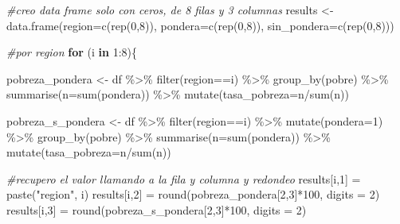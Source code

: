 \documentclass[
]{book}
\newenvironment{Shaded}{\begin{snugshade}}{\end{snugshade}}
\newcommand{\AttributeTok}[1]{\textcolor[rgb]{0.77,0.63,0.00}{#1}}
\newcommand{\CommentTok}[1]{\textcolor[rgb]{0.56,0.35,0.01}{\textit{#1}}}
\newcommand{\ControlFlowTok}[1]{\textcolor[rgb]{0.13,0.29,0.53}{\textbf{#1}}}
\newcommand{\DecValTok}[1]{\textcolor[rgb]{0.00,0.00,0.81}{#1}}
\newcommand{\FunctionTok}[1]{\textcolor[rgb]{0.00,0.00,0.00}{#1}}
\newcommand{\NormalTok}[1]{#1}
\newcommand{\OtherTok}[1]{\textcolor[rgb]{0.56,0.35,0.01}{#1}}
\newcommand{\SpecialCharTok}[1]{\textcolor[rgb]{0.00,0.00,0.00}{#1}}
\newcommand{\StringTok}[1]{\textcolor[rgb]{0.31,0.60,0.02}{#1}}
\begin{document}
\begin{Shaded}
\begin{Highlighting}[]
\CommentTok{\#creo data frame solo con ceros, de 8 filas y 3 columnas}
\NormalTok{results }\OtherTok{\textless{}{-}} \FunctionTok{data.frame}\NormalTok{(}\AttributeTok{region=}\FunctionTok{c}\NormalTok{(}\FunctionTok{rep}\NormalTok{(}\DecValTok{0}\NormalTok{,}\DecValTok{8}\NormalTok{)),}
                      \AttributeTok{pondera=}\FunctionTok{c}\NormalTok{(}\FunctionTok{rep}\NormalTok{(}\DecValTok{0}\NormalTok{,}\DecValTok{8}\NormalTok{)),}
                      \AttributeTok{sin\_pondera=}\FunctionTok{c}\NormalTok{(}\FunctionTok{rep}\NormalTok{(}\DecValTok{0}\NormalTok{,}\DecValTok{8}\NormalTok{)))}

\CommentTok{\#por region}
\ControlFlowTok{for}\NormalTok{ (i }\ControlFlowTok{in} \DecValTok{1}\SpecialCharTok{:}\DecValTok{8}\NormalTok{)\{}
  
\NormalTok{  pobreza\_pondera }\OtherTok{\textless{}{-}}\NormalTok{ df }\SpecialCharTok{\%\textgreater{}\%} \FunctionTok{filter}\NormalTok{(region}\SpecialCharTok{==}\NormalTok{i) }\SpecialCharTok{\%\textgreater{}\%} 
                            \FunctionTok{group\_by}\NormalTok{(pobre) }\SpecialCharTok{\%\textgreater{}\%} \FunctionTok{summarise}\NormalTok{(}\AttributeTok{n=}\FunctionTok{sum}\NormalTok{(pondera)) }\SpecialCharTok{\%\textgreater{}\%} 
                                                \FunctionTok{mutate}\NormalTok{(}\AttributeTok{tasa\_pobreza=}\NormalTok{n}\SpecialCharTok{/}\FunctionTok{sum}\NormalTok{(n))}
  
\NormalTok{  pobreza\_s\_pondera }\OtherTok{\textless{}{-}}\NormalTok{ df }\SpecialCharTok{\%\textgreater{}\%} \FunctionTok{filter}\NormalTok{(region}\SpecialCharTok{==}\NormalTok{i) }\SpecialCharTok{\%\textgreater{}\%}
                              \FunctionTok{mutate}\NormalTok{(}\AttributeTok{pondera=}\DecValTok{1}\NormalTok{) }\SpecialCharTok{\%\textgreater{}\%} 
                              \FunctionTok{group\_by}\NormalTok{(pobre) }\SpecialCharTok{\%\textgreater{}\%} \FunctionTok{summarise}\NormalTok{(}\AttributeTok{n=}\FunctionTok{sum}\NormalTok{(pondera)) }\SpecialCharTok{\%\textgreater{}\%}
                                                  \FunctionTok{mutate}\NormalTok{(}\AttributeTok{tasa\_pobreza=}\NormalTok{n}\SpecialCharTok{/}\FunctionTok{sum}\NormalTok{(n))}
  
  \CommentTok{\#recupero el valor llamando a la fila y columna y redondeo }
\NormalTok{  results[i,}\DecValTok{1}\NormalTok{] }\OtherTok{=} \FunctionTok{paste}\NormalTok{(}\StringTok{"region"}\NormalTok{, i)}
\NormalTok{  results[i,}\DecValTok{2}\NormalTok{] }\OtherTok{=} \FunctionTok{round}\NormalTok{(pobreza\_pondera[}\DecValTok{2}\NormalTok{,}\DecValTok{3}\NormalTok{]}\SpecialCharTok{*}\DecValTok{100}\NormalTok{, }\AttributeTok{digits =} \DecValTok{2}\NormalTok{)}
\NormalTok{  results[i,}\DecValTok{3}\NormalTok{] }\OtherTok{=} \FunctionTok{round}\NormalTok{(pobreza\_s\_pondera[}\DecValTok{2}\NormalTok{,}\DecValTok{3}\NormalTok{]}\SpecialCharTok{*}\DecValTok{100}\NormalTok{, }\AttributeTok{digits =} \DecValTok{2}\NormalTok{)}
  

\end{Highlighting}
\end{Shaded}
\end{document}
